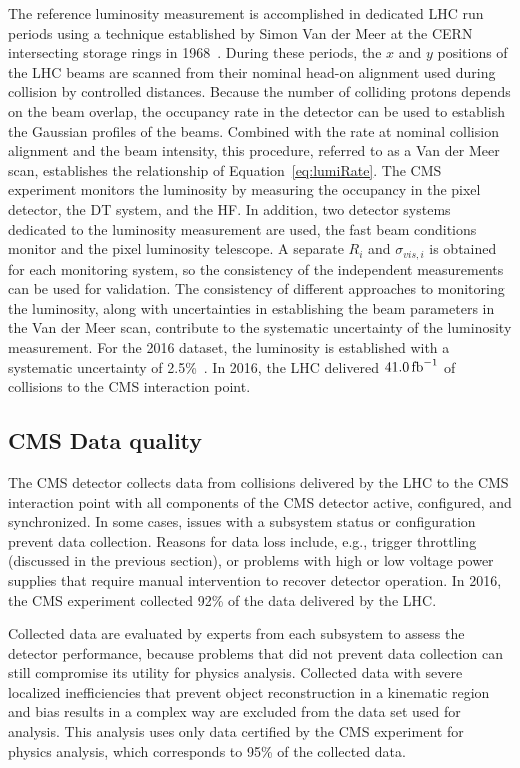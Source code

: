 The reference luminosity measurement is accomplished in dedicated LHC run periods using 
a technique established by Simon Van der Meer at the CERN intersecting storage
rings in 1968~\cite{vanderMeer:296752}. During these periods, the $x$ and $y$ positions of the LHC beams are
scanned from their nominal head-on alignment used during collision by controlled distances.
Because the number of colliding protons depends on the beam overlap,
the occupancy rate in the detector can be used to establish the Gaussian profiles of 
the beams. Combined with the rate at nominal collision alignment and the beam intensity,
this procedure, referred to as a Van der Meer scan, establishes the relationship of 
Equation~\ref{eq:lumiRate}.
The CMS experiment monitors the luminosity by measuring the occupancy
in the pixel detector, the DT system, and the HF. In addition, two detector
systems dedicated to the luminosity measurement are used, the fast beam conditions monitor 
and the pixel luminosity telescope. A separate $R_i$ and $\sigma_{vis,i}$ is obtained for
each monitoring system, so the consistency of the independent measurements can be used
for validation. 
The consistency of different approaches to monitoring the luminosity,
along with uncertainties in establishing the beam parameters in the Van der Meer scan,
contribute to the systematic uncertainty of the luminosity measurement. For the 2016
dataset, the luminosity is established with a systematic uncertainty of 2.5\%~\cite{CMS-PAS-LUM-17-001}.
In 2016, the LHC delivered $41.0\mbox{\ensuremath{\,\text{fb}^\text{$-$1}}}$ of {\pp} collisions to the CMS interaction point.

\subsection{CMS Data quality}

The CMS detector collects data from collisions delivered by the LHC to the CMS interaction point
with all components of the CMS detector active, configured, and synchronized. In some cases,
issues with a subsystem status or configuration prevent data collection. Reasons for data loss include, e.g., 
trigger throttling (discussed in the previous section), or problems with
high or low voltage power supplies that require manual intervention to recover detector operation.
In 2016, the CMS experiment collected 92\% of the data delivered by the LHC. 

Collected data
are evaluated by experts from each subsystem to assess the detector performance, because 
problems that did not prevent data collection can still compromise its utility for physics analysis.
Collected data with severe localized inefficiencies that prevent 
object reconstruction in a kinematic region and bias results in a complex way are excluded from 
the data set used for analysis.
This analysis uses only data certified by the CMS
experiment for physics analysis, which corresponds to 95\% of the collected data.

